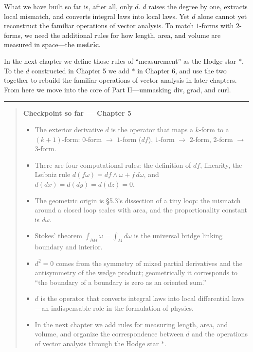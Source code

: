 What we have built so far is, after all, only \(d\). \(d\) raises the
degree by one, extracts local mismatch, and converts integral laws into
local laws. Yet \(d\) alone cannot yet reconstruct the familiar
operations of vector analysis. To match \(1\)-forms with \(2\)-forms, we
need the additional rules for how length, area, and volume are measured
in space---the \textbf{metric}.

In the next chapter we define those rules of ``measurement'' as the
Hodge star \(\ast\). To the \(d\) constructed in Chapter 5 we add
\(\ast\) in Chapter 6, and use the two together to rebuild the familiar
operations of vector analysis in later chapters. From here we move into
the core of Part II---unmasking div, grad, and curl.

\begin{center}\rule{0.5\linewidth}{0.5pt}\end{center}

\begin{quote}
\textbf{Checkpoint so far — Chapter 5}

\begin{itemize}
\item
  The exterior derivative \(d\) is the operator that maps a \(k\)-form
  to a \((k+1)\)-form: \(0\)-form \(\to\) \(1\)-form (\(df\)),
  \(1\)-form \(\to\) \(2\)-form, \(2\)-form \(\to\) \(3\)-form.
\item
  There are four computational rules: the definition of \(df\),
  linearity, the Leibniz rule
  \(d(f\omega) = df\wedge\omega + f\,d\omega\), and
  \(d(dx)=d(dy)=d(dz)=0\).
\item
  The geometric origin is §5.3's dissection of a tiny loop: the mismatch
  around a closed loop scales with area, and the proportionality
  constant is \(d\omega\).
\item
  Stokes' theorem \(\int_{\partial M} \omega = \int_M d\omega\) is the
  universal bridge linking boundary and interior.
\item
  \(d^2 = 0\) comes from the symmetry of mixed partial derivatives and
  the antisymmetry of the wedge product; geometrically it corresponds to
  ``the boundary of a boundary is zero as an oriented sum.''
\item
  \(d\) is the operator that converts integral laws into local
  differential laws---an indispensable role in the formulation of
  physics.
\item
  In the next chapter we add rules for measuring length, area, and
  volume, and organize the correspondence between \(d\) and the
  operations of vector analysis through the Hodge star \(\ast\).
\end{itemize}
\end{quote}

